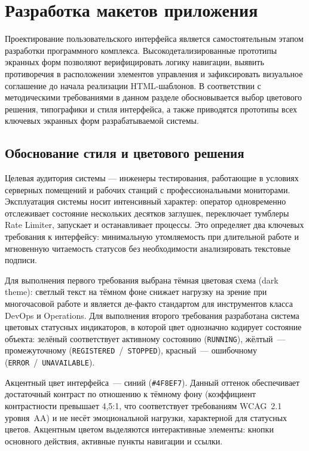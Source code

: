 
\section{Разработка макетов приложения}

Проектирование пользовательского интерфейса является самостоятельным этапом разработки программного комплекса. Высокодетализированные прототипы экранных форм позволяют верифицировать логику навигации, выявить противоречия в расположении элементов управления и зафиксировать визуальное соглашение до начала реализации HTML-шаблонов. В соответствии с методическими требованиями в данном разделе обосновывается выбор цветового решения, типографики и стиля интерфейса, а также приводятся прототипы всех ключевых экранных форм разрабатываемой системы.

\subsection{Обоснование стиля и цветового решения}

Целевая аудитория системы --- инженеры тестирования, работающие в условиях серверных помещений и рабочих станций с профессиональными мониторами. Эксплуатация системы носит интенсивный характер: оператор одновременно отслеживает состояние нескольких десятков заглушек, переключает тумблеры Rate Limiter, запускает и останавливает процессы. Это определяет два ключевых требования к интерфейсу: минимальную утомляемость при длительной работе и мгновенную читаемость статусов без необходимости анализировать текстовые подписи.

Для выполнения первого требования выбрана тёмная цветовая схема (dark theme): светлый текст на тёмном фоне снижает нагрузку на зрение при многочасовой работе и является де-факто стандартом для инструментов класса DevOps и Operations. Для выполнения второго требования разработана система цветовых статусных индикаторов, в которой цвет однозначно кодирует состояние объекта: зелёный соответствует активному состоянию (\texttt{RUNNING}), жёлтый~--- промежуточному (\texttt{REGISTERED}~/~\texttt{STOPPED}), красный~--- ошибочному (\texttt{ERROR}~/~\texttt{UNAVAILABLE}).

Акцентный цвет интерфейса~--- синий (\texttt{\#4F8EF7}). Данный оттенок обеспечивает достаточный контраст по отношению к тёмному фону (коэффициент контрастности превышает 4,5:1, что соответствует требованиям WCAG~2.1 уровня~AA) и не несёт эмоциональной нагрузки, характерной для статусных цветов. Акцентным цветом выделяются интерактивные элементы: кнопки основного действия, активные пункты навигации и ссылки.

